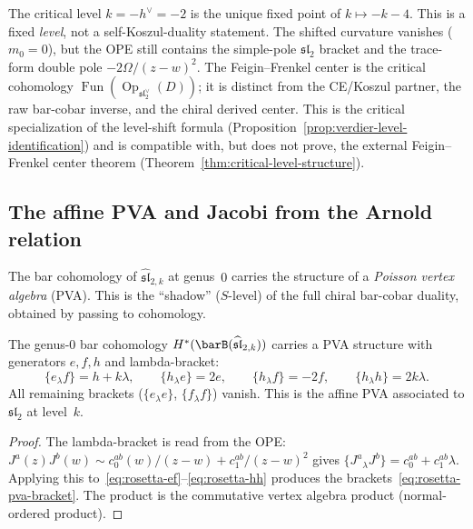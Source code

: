 \begin{remark}
\label{rem:rosetta-critical}
The critical level $k = -h^\vee = -2$ is the unique fixed point
of $k \mapsto -k - 4$. This is a fixed \emph{level}, not a
self-Koszul-duality statement. The shifted curvature vanishes
($m_0=0$), but the OPE still contains the simple-pole
$\mathfrak{sl}_2$ bracket and the trace-form double pole
$-2\Omega/(z-w)^2$. The Feigin--Frenkel center is the critical
cohomology
$\operatorname{Fun}(\operatorname{Op}_{\mathfrak{sl}_2^\vee}(D))$;
it is distinct from the CE/Koszul partner, the raw bar-cobar
inverse, and the chiral derived center. This is the critical
specialization of the level-shift formula
\textup{(}Proposition~\textup{\ref{prop:verdier-level-identification}}\textup{)}
and is compatible with, but does not prove, the external
Feigin--Frenkel center theorem
\textup{(}Theorem~\textup{\ref{thm:critical-level-structure}}\textup{)}.
\end{remark}


\subsection{The affine PVA and Jacobi from the Arnold relation}
\label{subsec:rosetta-pva}

The bar cohomology of $\widehat{\mathfrak{sl}}_{2,k}$ at genus~$0$
carries the structure of a \emph{Poisson vertex algebra} (PVA).
This is the ``shadow'' ($S$-level) of the full chiral bar-cobar
duality, obtained by passing to cohomology.

\begin{proposition}
\label{prop:rosetta-sl2-pva}
The genus-$0$ bar cohomology
$H^*(\barB(\widehat{\mathfrak{sl}}_{2,k}))$ carries a PVA structure
with generators $e, f, h$ and lambda-bracket\textup{:}
\begin{equation}\label{eq:rosetta-pva-bracket}
\{e {}_\lambda f\} = h + k\lambda, \qquad
\{h {}_\lambda e\} = 2e, \qquad
\{h {}_\lambda f\} = -2f, \qquad
\{h {}_\lambda h\} = 2k\lambda.
\end{equation}
All remaining brackets \textup{(}$\{e {}_\lambda e\}$,
$\{f {}_\lambda f\}$\textup{)} vanish. This is the affine PVA
associated to $\mathfrak{sl}_2$ at level~$k$.
\end{proposition}

\begin{proof}
The lambda-bracket is read from the OPE:
$J^a(z) J^b(w) \sim c_0^{ab}(w)/(z-w) + c_1^{ab}/(z-w)^2$ gives
$\{J^a {}_\lambda J^b\} = c_0^{ab} + c_1^{ab}\lambda$. Applying
this to~\eqref{eq:rosetta-ef}--\eqref{eq:rosetta-hh} produces the
brackets~\eqref{eq:rosetta-pva-bracket}. The product is the
commutative vertex algebra product (normal-ordered product).
\end{proof}

